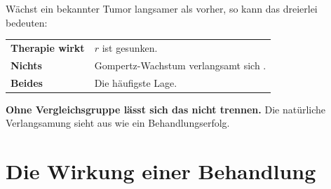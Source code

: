 \begin{warnung}
Wächst ein bekannter Tumor langsamer als vorher, so kann das dreierlei bedeuten:

\begin{center}
\renewcommand{\arraystretch}{1.5}
\begin{tabular}{@{}P{2.4cm}P{6.2cm}@{}}
\toprule
\textbf{Therapie wirkt} & $r$ ist gesunken.\\
\textbf{Nichts} & Gompertz-Wachstum verlangsamt sich .\\
\textbf{Beides} & Die häufigste Lage.\\
\bottomrule
\end{tabular}
\end{center}

\begin{center}
\begin{minipage}{0.9\textwidth}
\textbf{Ohne Vergleichsgruppe lässt sich das nicht trennen.} Die natürliche Verlangsamung sieht aus wie ein Behandlungserfolg.
\end{minipage}
\end{center}

\begin{center}
\begin{minipage}{0.88\textwidth}
\end{minipage}
\end{center}
\end{warnung}

\section{Die Wirkung einer Behandlung}

